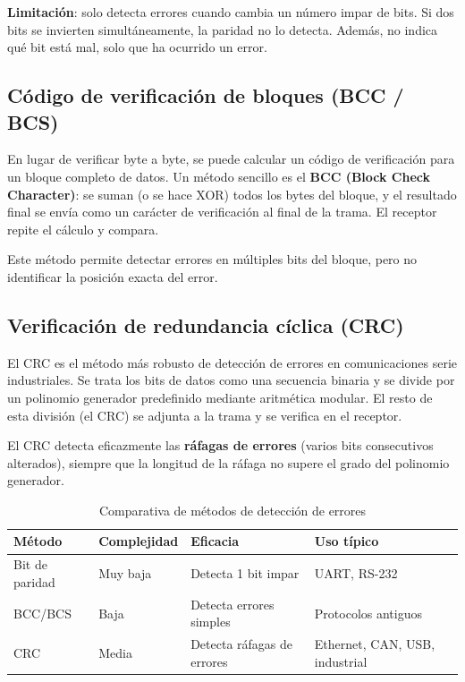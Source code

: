 \textbf{Limitación}: solo detecta errores cuando cambia un número impar de bits. Si dos bits se invierten simultáneamente, la paridad no lo detecta. Además, no indica qué bit está mal, solo que ha ocurrido un error.

\subsection{Código de verificación de bloques (BCC / BCS)}

En lugar de verificar byte a byte, se puede calcular un código de verificación para un bloque completo de datos. Un método sencillo es el \textbf{BCC (Block Check Character)}: se suman (o se hace XOR) todos los bytes del bloque, y el resultado final se envía como un carácter de verificación al final de la trama. El receptor repite el cálculo y compara.

Este método permite detectar errores en múltiples bits del bloque, pero no identificar la posición exacta del error.

\subsection{Verificación de redundancia cíclica (CRC)}

El CRC es el método más robusto de detección de errores en comunicaciones serie industriales. Se trata los bits de datos como una secuencia binaria y se divide por un polinomio generador predefinido mediante aritmética modular. El resto de esta división (el CRC) se adjunta a la trama y se verifica en el receptor.

El CRC detecta eficazmente las \textbf{ráfagas de errores} (varios bits consecutivos alterados), siempre que la longitud de la ráfaga no supere el grado del polinomio generador.

\begin{table}[htbp]
\centering
\small
\caption{Comparativa de métodos de detección de errores}
\begin{tabularx}{\textwidth}{@{}lXXX@{}}
\toprule
\textbf{Método} & \textbf{Complejidad} & \textbf{Eficacia} & \textbf{Uso típico} \\
\midrule
Bit de paridad & Muy baja & Detecta 1 bit impar & UART, RS-232 \\
BCC/BCS & Baja & Detecta errores simples & Protocolos antiguos \\
CRC & Media & Detecta ráfagas de errores & Ethernet, CAN, USB, industrial \\
\bottomrule
\end{tabularx}
\end{table}


